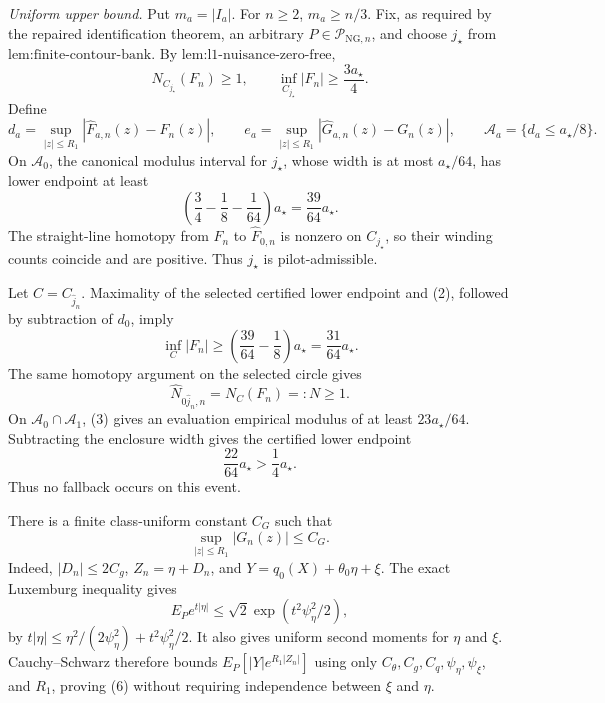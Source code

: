 \emph{Uniform upper bound.}  Put \(m_a=|I_a|\).  For \(n\ge2\), \(m_a\ge n/3\).  Fix, as required by the repaired identification theorem, an arbitrary \(P\in\mathcal P_{\mathrm{NG},n}\), and choose \(j_{\star}\) from \(\text{lem:finite-contour-bank}\).  By \(\text{lem:l1-nuisance-zero-free}\),
\[
 N_{C_{j_{\star}}}(F_n)\ge1,
 \qquad
 \inf_{C_{j_{\star}}}|F_n|\ge\frac{3a_{\star}}4.
 \tag{1}
\]
Define
\[
 d_a=\sup_{|z|\le R_1}|\widehat F_{a,n}(z)-F_n(z)|,
 \qquad
 e_a=\sup_{|z|\le R_1}|\widehat G_{a,n}(z)-G_n(z)|,
 \qquad
 \mathcal A_a=\{d_a\le a_{\star}/8\}.
\]
On \(\mathcal A_0\), the canonical modulus interval for \(j_{\star}\), whose width is at most \(a_{\star}/64\), has lower endpoint at least
\[
 \left(\frac34-\frac18-\frac1{64}\right)a_{\star}
 =\frac{39}{64}a_{\star}.
 \tag{2}
\]
The straight-line homotopy from \(F_n\) to \(\widehat F_{0,n}\) is nonzero on \(C_{j_{\star}}\), so their winding counts coincide and are positive.  Thus \(j_{\star}\) is pilot-admissible.

Let \(C=C_{\widehat j_n}\).  Maximality of the selected certified lower endpoint and (2), followed by subtraction of \(d_0\), imply
\[
 \inf_C|F_n|
 \ge\left(\frac{39}{64}-\frac18\right)a_{\star}
 =\frac{31}{64}a_{\star}.
 \tag{3}
\]
The same homotopy argument on the selected circle gives
\[
 \widehat N_{0\widehat j_n,n}=N_C(F_n)=:N\ge1.
 \tag{4}
\]
On \(\mathcal A_0\cap\mathcal A_1\), (3) gives an evaluation empirical modulus of at least \(23a_{\star}/64\).  Subtracting the enclosure width gives the certified lower endpoint
\[
 \frac{22}{64}a_{\star}>\frac14a_{\star}.
 \tag{5}
\]
Thus no fallback occurs on this event.

There is a finite class-uniform constant \(C_G\) such that
\[
 \sup_{|z|\le R_1}|G_n(z)|\le C_G.
 \tag{6}
\]
Indeed, \(|D_n|\le2C_g\), \(Z_n=\eta+D_n\), and \(Y=q_0(X)+\theta_0\eta+\xi\).  The exact Luxemburg inequality gives
\[
 E_Pe^{t|\eta|}
 \le\sqrt2\exp(t^2\psi_{\eta}^2/2),
\]
by \(t|\eta|\le\eta^2/(2\psi_{\eta}^2)+t^2\psi_{\eta}^2/2\).  It also gives uniform second moments for \(\eta\) and \(\xi\).  Cauchy--Schwarz therefore bounds \(E_P[|Y|e^{R_1|Z_n|}]\) using only \(C_{\theta},C_g,C_q,\psi_{\eta},\psi_{\xi}\), and \(R_1\), proving (6) without requiring independence between \(\xi\) and \(\eta\).

